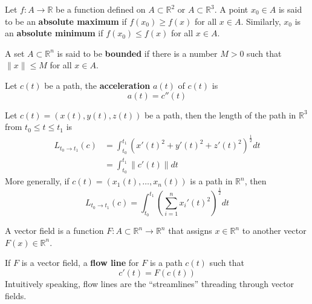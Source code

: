 \documentclass[openany]{book}
\newcommand{\R}{\mathbb{R}}
\begin{document}
\begin{defn}
    Let $f:A\to\R$ be a function defined on $A\subset\R^2$ or $A\subset\R^3$. A point $x_0\in A$ is said to be an \textbf{absolute maximum} if $f(x_0)\geq f(x)$ for all $x\in A$. Similarly, $x_0$ is an \textbf{absolute minimum} if $f(x_0)\leq f(x)$ for all $x\in A$. 
\end{defn}

\begin{defn}
    A set $A\subset\R^n$ is said to be \textbf{bounded} if there is a number $M>0$ such that $\|x\|\leq M$ for all $x\in A$. 
\end{defn}

\begin{defn}[acceleration]
    Let $c(t)$ be a path, the \textbf{acceleration} $a(t)$ of $c(t)$ is 
    \begin{equation*}
        a(t)=c''(t)
    \end{equation*}
\end{defn}



\begin{defn}
    Let $c(t)=(x(t), y(t), z(t))$ be a path, then the length of the path in $\R^3$ from $t_0\leq t\leq t_1$ is 
    \begin{align*}
        L_{t_0\to t_1}(c)&=\int_{t_0}^{t_1}\left(x'(t)^2+y'(t)^2+z'(t)^2\right)^\frac{1}{2}dt\\
        &=\int_{t_0}^{t_1}\|c'(t)\|dt
    \end{align*}
    More generally, if $c(t)=(x_1(t), \dots, x_n(t))$ is a path in $\R^n$, then 
    \begin{equation*}
        L_{t_0\to t_1}(c)=\int_{t_0}^{t_1}\left(\sum_{i=1}^nx_i'(t)^2\right)^\frac{1}{2}dt
    \end{equation*}
\end{defn}


\begin{defn}
    A vector field is a function $F:A\subset\R^n\to\R^n$ that assigns $x\in\R^n$ to another vector $F(x)\in\R^n$.
\end{defn}


\begin{defn}
    If $F$ is a vector field, a \textbf{flow line} for $F$ is a path $c(t)$ such that 
    \begin{equation*}
        c'(t)=F(c(t))
    \end{equation*}
    Intuitively speaking, flow lines are the ``streamlines'' threading through vector fields.
\end{defn}
\end{document}
